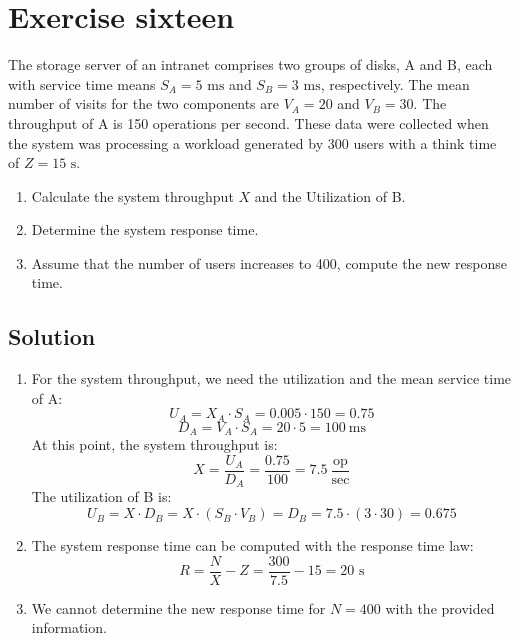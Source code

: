 \section{Exercise sixteen}

The storage server of an intranet comprises two groups of disks, A and B, each with service time means $S_A=5\text{ ms}$ and $S_B=3\text{ ms}$, respectively.
The mean number of visits for the two components are $V_A = 20$ and $V_B = 30$. 
The throughput of A is 150 operations per second. 
These data were collected when the system was processing a workload generated by 300 users with a think time of $Z=15\text{ s}$.
\begin{enumerate}
    \item Calculate the system throughput $X$ and the Utilization of B.
    \item Determine the system response time.
    \item Assume that the number of users increases to 400, compute the new response time.
\end{enumerate}

\subsection*{Solution}
\begin{enumerate}
    \item For the system throughput, we need the utilization and the mean service time of A:
        \[U_A=X_A\cdot S_A=0.005 \cdot 150=0.75\]
        \[D_A=V_A\cdot S_A=20 \cdot 5=100\:\text{ms}\]
        At this point, the system throughput is:
        \[X=\dfrac{U_A}{D_A}=\dfrac{0.75}{100}=7.5\:\dfrac{\text{op}}{\text{sec}}\]
        The utilization of B is:
        \[U_B=X\cdot D_B=X\cdot(S_B\cdot V_B)=D_B=7.5\cdot(3\cdot 30)=0.675\]
    \item The system response time can be computed with the response time law:
        \[R=\dfrac{N}{X}-Z=\dfrac{300}{7.5}-15=20\text{ s}\]
    \item We cannot determine the new response time for $N=400$ with the provided information.
\end{enumerate}
